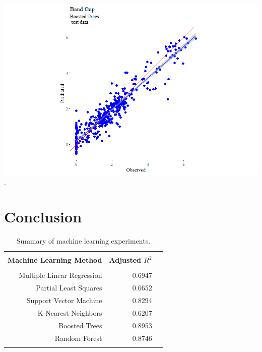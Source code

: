 \documentclass[10pt, letter]{report}
\renewcommand{\=}{\, =\, }
\newcommand{\+}{\, +\, }
\renewcommand{\-}{\, -\, }
\begin{document}
\begin{center}
\includegraphics[scale = 0.8]{BoostedTreesTestDataFit.png}
.
\end{center}

\chapter{Conclusion}

\begin{table}[H]
\begin{center}
\begin{tabular}{rrr}
\toprule
&&\\
{\bf Machine Learning Method} & {\bf Adjusted \( R^2 \)} \\
\midrule
&&\\
Multiple Linear Regression  &   0.6947 \\
Partial Least Squares &  0.6652 \\
Support Vector Machine  & 0.8294 \\
K-Nearest Neighbors &  0.6207 \\ 
Boosted Trees &  0.8953 \\
Random Forest &  0.8746 \\
&&\\
\bottomrule
\end{tabular}
\end{center}
\caption{Summary of machine learning experiments.}
\end{table}
\end{document}
